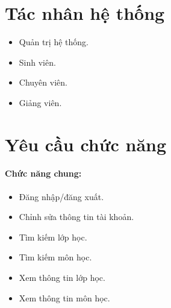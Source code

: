 \documentclass[12pt]{book}
\begin{document}
  \section{Tác nhân hệ thống}
    \begin{itemize}
      \item Quản trị hệ thống.
      \item Sinh viên.
      \item Chuyên viên.
      \item Giảng viên.
    \end{itemize}
  
  \section{Yêu cầu chức năng}
    \paragraph{Chức năng chung:}
    \begin{itemize}
      \item Đăng nhập/đăng xuất.
      \item Chỉnh sửa thông tin tài khoản.
      \item Tìm kiếm lớp học.
      \item Tìm kiếm môn học.
      \item Xem thông tin lớp học.
      \item Xem thông tin môn học.
    \end{itemize}
\end{document}
